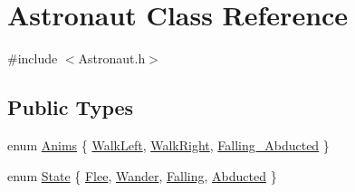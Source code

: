 \hypertarget{class_astronaut}{}\section{Astronaut Class Reference}
\label{class_astronaut}


{\ttfamily \#include $<$Astronaut.\+h$>$}

\subsection*{Public Types}
\begin{DoxyCompactItemize}
\item 
enum \hyperlink{class_astronaut_a36c4be46e5ecdf54256228b3f37d0ba3}{Anims} \{ \hyperlink{class_astronaut_a36c4be46e5ecdf54256228b3f37d0ba3af5bc7e1f65137bfd2ca4f23291f282d8}{Walk\+Left}, 
\hyperlink{class_astronaut_a36c4be46e5ecdf54256228b3f37d0ba3ac615271362fc6d2058af61d13bc5d07a}{Walk\+Right}, 
\hyperlink{class_astronaut_a36c4be46e5ecdf54256228b3f37d0ba3af300bb1b0243d51a6a6e6ac48416b043}{Falling\+\_\+\+Abducted}
 \}
\item 
enum \hyperlink{class_astronaut_ac8bdb05a39112336728de09ce0428c9f}{State} \{ \hyperlink{class_astronaut_ac8bdb05a39112336728de09ce0428c9fa5cfbf42b26cd3105e16fdebca0e00f00}{Flee}, 
\hyperlink{class_astronaut_ac8bdb05a39112336728de09ce0428c9fad608422fad91be9e6303f166e3774136}{Wander}, 
\hyperlink{class_astronaut_ac8bdb05a39112336728de09ce0428c9fa3318318cb25512762266bbc2a0cf3213}{Falling}, 
\hyperlink{class_astronaut_ac8bdb05a39112336728de09ce0428c9fa93070abd8f976010b6e4955962e63a48}{Abducted}
 \}
\end{DoxyCompactItemize}

